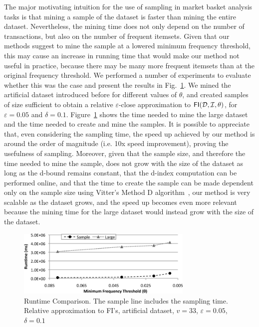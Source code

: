 The major motivating intuition for the use of sampling in market basket analysis
tasks is that mining a sample of the dataset is faster than mining the entire
dataset. Nevertheless, the mining time does not only depend on the number of
transactions, but also on the number of frequent itemsets. Given that our
methods suggest to mine the sample at a lowered minimum frequency threshold,
this may cause an increase in running time that would make our method not useful
in practice, because there may be many more frequent itemsets than at the
original frequency threshold. We performed a number of experiments to evaluate
whether this was the case and present the results in Fig.~\ref{fig:runtime}. 
We mined the artificial dataset introduced before for different values of $\theta$,
and created samples of size sufficient to obtain a relative $\varepsilon$-close
approximation to $\mathsf{FI}({\cal D},{\cal I},\theta)$, for $\varepsilon=0.05$ and
$\delta=0.1$. Figure~\ref{fig:runtime} shows the time needed to mine the large
dataset and the time needed to create and mine the samples. It is possible to
appreciate that, even considering the sampling time, the speed up achieved by
our method is around the order of magnitude (i.e. 10x speed improvement),
proving the usefulness of sampling. Moreover, given that the sample size, and
therefore the time needed to mine the sample, does not grow with the size of the
dataset as long as the d-bound remains constant, that the d-index computation
can be performed online, and that the time to create the sample can be made
dependent only on the sample size using Vitter's Method D
algorithm~\citep{Vitter87}, our method is very scalable as the dataset grows, and
the speed up becomes even more relevant because the mining time for the large
dataset would instead grow with the size of the dataset.

\begin{figure}[tp]
  \centering
  \includegraphics[width=0.75\textwidth]{vcmine/Fig4}
  \caption{Runtime Comparison. The sample line includes the sampling time.
  Relative approximation to FI's, artificial dataset, $v=33$, $\varepsilon=0.05$,
  $\delta=0.1$}
  \label{fig:runtime}
\end{figure}

